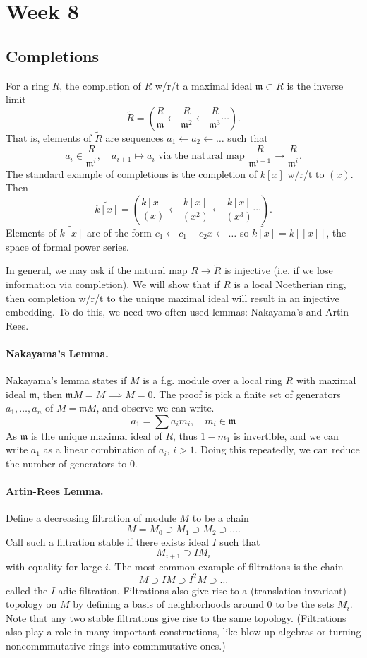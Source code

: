 \section{Week 8}

\subsection{Completions}
For a ring $R$, the completion of $R$ w/r/t a maximal ideal $\mathfrak m \subset R$ is the inverse limit
\[
    \tilde{R} = \left( \frac{R}{\mathfrak m} \leftarrow \frac{R}{\mathfrak m^2} \leftarrow \frac{R}{\mathfrak m^3} \cdots \right).
\]
That is, elements of $\tilde{R}$ are sequences $a_1 \leftarrow a_2 \leftarrow \dots$ such that
\[
    a_i \in \frac{R}{\mathfrak m^i}, \quad a_{i+1} \mapsto a_i \text{ via the natural map } \frac{R}{\mathfrak m^{i+1}} \to \frac{R}{\mathfrak m^i}.
\]
The standard example of completions is the completion of $k[x]$ w/r/t to $(x)$. Then
\[
    \tilde{k[x]} = \left( \frac{k[x]}{(x)} \leftarrow \frac{k[x]}{(x^2)} \leftarrow \frac{k[x]}{(x^3)} \cdots \right).
\]
Elements of $\tilde{k[x]}$ are of the form $c_1 \leftarrow c_1 + c_2x \leftarrow \dots$ so $\tilde{k[x]} = k[[x]]$, the space of formal power series.

In general, we may ask if the natural map $R \to \tilde{R}$ is injective (i.e. if we lose information via completion). We will show that if $R$ is a local Noetherian ring, then completion w/r/t to the unique maximal ideal will result in an injective embedding. To do this, we need two often-used lemmas: Nakayama's and Artin-Rees.

\paragraph{Nakayama's Lemma.} Nakayama's lemma states if $M$ is a f.g. module over a local ring $R$ with maximal ideal $\mathfrak m$, then $\mathfrak m M = M \implies M = 0$. The proof is pick a finite set of generators $a_1, \dots, a_n$ of $M = \mathfrak m M$, and observe we can write.
\[
    a_1 = \sum a_i m_i, \quad m_i \in \mathfrak m
\]
As $\mathfrak m$ is the unique maximal ideal of $R$, thus $1 - m_1$ is invertible, and we can write $a_1$ as a linear combination of $a_i$, $i > 1$. Doing this repeatedly, we can reduce the number of generators to 0.

\paragraph{Artin-Rees Lemma.} Define a decreasing filtration of module $M$ to be a chain
\[
    M = M_0 \supset M_1 \supset M_2 \supset \dots.
\]
Call such a filtration stable if there exists ideal $I$ such that
\[
    M_{i+1} \supset IM_{i}
\]
with equality for large $i$. The most common example of filtrations is the chain
\[
    M \supset IM \supset I^2M \supset \dots
\]
called the $I$-adic filtration. Filtrations also give rise to a (translation invariant) topology on $M$ by defining a basis of neighborhoods around 0 to be the sets $M_i$. Note that any two stable filtrations give rise to the same topology. (Filtrations also play a role in many important constructions, like blow-up algebras or turning noncommmutative rings into commmutative ones.)

